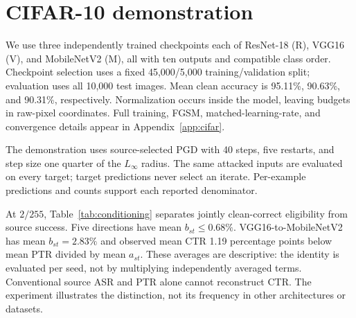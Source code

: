 \documentclass[10pt]{article}
\begin{document}
\section{CIFAR-10 demonstration}
We use three independently trained checkpoints each of ResNet-18 (R), VGG16 (V), and MobileNetV2 (M), all with ten outputs and compatible class order. Checkpoint selection uses a fixed 45,000/5,000 training/validation split; evaluation uses all 10,000 test images. Mean clean accuracy is 95.11\%, 90.63\%, and 90.31\%, respectively. Normalization occurs inside the model, leaving budgets in raw-pixel coordinates. Full training, FGSM, matched-learning-rate, and convergence details appear in Appendix~\ref{app:cifar}.

The demonstration uses source-selected PGD with 40 steps, five restarts, and step size one quarter of the $L_\infty$ radius. The same attacked inputs are evaluated on every target; target predictions never select an iterate. Per-example predictions and counts support each reported denominator.

At $2/255$, Table~\ref{tab:conditioning} separates jointly clean-correct eligibility from source success. Five directions have mean $b_{st}\leq0.68\%$. VGG16-to-MobileNetV2 has mean $b_{st}=2.83\%$ and observed mean CTR 1.19 percentage points below mean PTR divided by mean $a_{st}$. These averages are descriptive: the identity is evaluated per seed, not by multiplying independently averaged terms. Conventional source ASR and PTR alone cannot reconstruct CTR. The experiment illustrates the distinction, not its frequency in other architectures or datasets.
\end{document}
